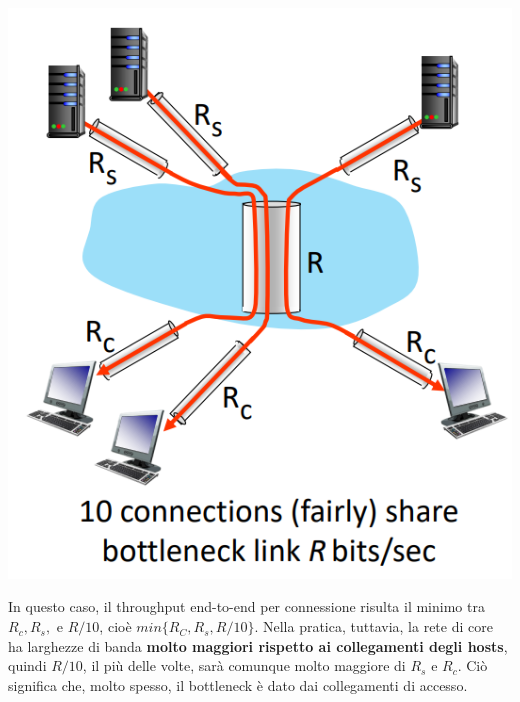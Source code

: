 \documentclass[12pt]{article}
\begin{document}
\begin{center}
    \includegraphics[width =0.40\linewidth]{Images/23.PNG}
\end{center}
In questo caso, il throughput end-to-end per connessione risulta il minimo tra $R_c, R_s,$ e $R/10$, cioè $min\{R_C, R_s, R/10\}$.
Nella pratica, tuttavia, la rete di core ha larghezze di banda \textbf{molto maggiori rispetto ai collegamenti degli hosts}, quindi $R/10$, il più delle volte, sarà comunque molto maggiore di $R_s$ e $R_c$.
Ciò significa che, molto spesso, il bottleneck è dato dai collegamenti di accesso.
\end{document}
